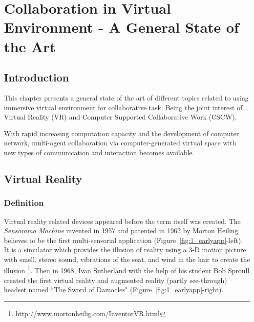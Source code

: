 \chapter{Collaboration in Virtual Environment - A General State of the Art}
\label{chapter:context}
\minitoc

\section{Introduction}
This chapter presents a general state of the art of different topics related to using immersive virtual environment for collaborative task. Being the joint interest of Virtual Reality (VR) and Computer Supported Collaborative Work (CSCW).

With rapid increasing computation capacity and the development of computer network, multi-agent collaboration via computer-generated virtual space with new types of communication and interaction becomes available.

\section{Virtual Reality}
\subsection{Definition}
Virtual reality related devices appeared before the term itself was created. The \textit{Sensorama Machine} invented in 1957 and patented in 1962 by Morton Heiling believes to be the first multi-sensorial application (Figure~\ref{fig:1_earlyapp}-left). It is a simulator which provides the illusion of reality using a 3-D motion picture with smell, stereo sound, vibrations of the seat, and wind in the hair to create the illusion \footnote{http://www.mortonheilig.com/InventorVR.html}. Then in 1968, Ivan Sutherland with the help of his student Bob Sproull created the first virtual reality and augmented reality (partly see-through) headset named ``The Sword of Damocles" \citep{Sutherland1968Hmd} (Figure~\ref{fig:1_earlyapp}-right).

